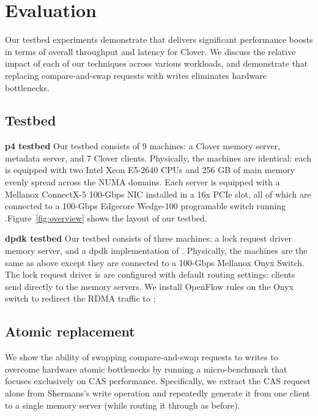 \section{Evaluation}
\label{s:results}

Our testbed experiments demonstrate that {\sword} delivers significant
performance boosts in terms of overall throughput and latency for
Clover. We discuss the relative impact of each of our techniques across
various workloads, and demonstrate that replacing compare-and-swap
requests with writes eliminates hardware bottlenecks.

\subsection{Testbed} 

\textbf{p4 testbed} Our testbed consists of 9 machines: a Clover memory server,
metadata server, and 7 Clover clients. Physically, the machines are identical:
each is equipped with two Intel Xeon E5-2640 CPUs and 256 GB of main memory
evenly spread across the NUMA domains. Each server is equipped with a Mellanox
ConnectX-5 100-Gbps NIC installed in a 16x PCIe slot, all of which are connected
to a 100-Gbps Edgecore Wedge-100 programable switch running
\sword.Figure~\ref{fig:overview} shows the layout of our testbed.


\textbf{dpdk testbed} Our testbed consists of three machines: a lock request
driver memory server, and a dpdk implementation of {\sword}.  Physically, the
machines are the same as above except they are connected to a 100-Gbps Mellanox
Onyx Switch. The lock request driver is are configured with default routing
settings: clients send directly to the memory servers. We install OpenFlow rules
on the Onyx switch to redirect the RDMA traffic to \sword; 

\subsection{Atomic replacement}

We show the ability of swapping compare-and-swap requests to writes to overcome
hardware atomic bottlenecks by running a micro-benchmark that focuses
exclusively on CAS performance. Specifically, we extract the CAS request alone
from Shermans's write operation and repeatedly generate it from one client to a
single memory server (while routing it through {\sword} as before).


